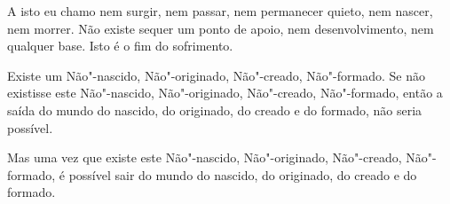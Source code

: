 A isto eu chamo nem surgir, nem passar, nem permanecer quieto, nem nascer, nem
morrer. Não existe sequer um ponto de apoio, nem desenvolvimento, nem qualquer
base. Isto é o fim do sofrimento.


Existe um Não"-nascido, Não"-originado, Não"-creado, Não"-formado. Se não existisse
este Não"-nascido, Não"-originado, Não"-creado, Não"-formado, então a saída do mundo
do nascido, do originado, do creado e do formado, não seria possível.

Mas uma vez que existe este Não"-nascido, Não"-originado, Não"-creado, Não"-formado,
é possível sair do mundo do nascido, do originado, do creado e do formado.


